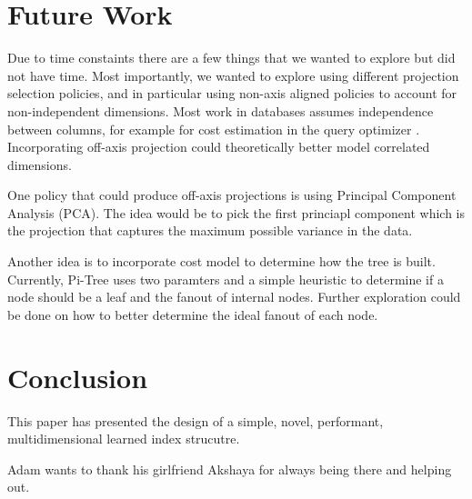\documentclass[sigconf,10pt]{acmart}
\begin{document}
\section{Future Work}

Due to time constaints there are a few things
that we wanted to explore but did not have time.
Most importantly, we wanted to explore using different
projection selection policies, and in particular using
non-axis aligned policies to account for non-independent dimensions.
Most work in databases assumes independence between columns,
for example for cost estimation in the query optimizer \cite{SelectivityEstimation}.
Incorporating off-axis projection could theoretically better model 
correlated dimensions.

One policy that could produce off-axis projections is using
Principal Component Analysis (PCA). The idea would be to 
pick the first princiapl component which is the projection that captures
the maximum possible variance in the data.

Another idea is to incorporate cost model to determine how the tree is built.
Currently, Pi-Tree uses two paramters and a simple heuristic to determine
if a node should be a leaf and the fanout of internal nodes.
Further exploration could be done on how to better determine the ideal
fanout of each node.

\section{Conclusion}

This paper has presented the design of a simple,
novel, performant, multidimensional learned index strucutre.

\begin{acks}
Adam wants to thank his girlfriend Akshaya for always being there and
helping out.
\end{acks}



\end{document}

